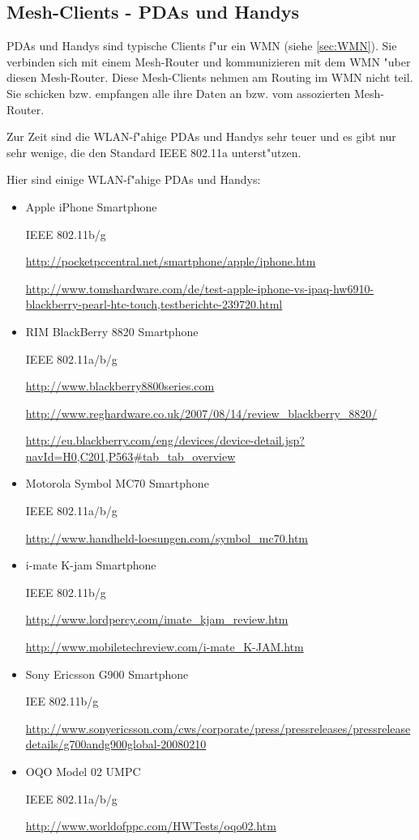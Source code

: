\subsection{Mesh-Clients - PDAs und Handys}

PDAs und Handys sind typische Clients f"ur ein WMN (siehe \ref{sec:WMN}).
Sie verbinden sich mit einem Mesh-Router und kommunizieren mit dem WMN
"uber diesen Mesh-Router.  Diese Mesh-Clients nehmen am Routing im WMN
nicht teil. Sie schicken bzw. empfangen alle ihre Daten an bzw. vom
assozierten Mesh-Router.

Zur Zeit sind die WLAN-f"ahige PDAs und Handys sehr teuer und
es gibt nur sehr wenige, die den Standard IEEE 802.11a unterst"utzen.

Hier sind einige WLAN-f"ahige PDAs und Handys:

\begin{itemize}	

\item Apple iPhone Smartphone

IEEE 802.11b/g

\url{http://pocketpccentral.net/smartphone/apple/iphone.htm}

\url{http://www.tomshardware.com/de/test-apple-iphone-vs-ipaq-hw6910-blackberry-pearl-htc-touch,testberichte-239720.html}

\item RIM BlackBerry 8820 Smartphone

IEEE 802.11a/b/g

\url{http://www.blackberry8800series.com}

\url{http://www.reghardware.co.uk/2007/08/14/review\_blackberry\_8820/}

\url{http://eu.blackberry.com/eng/devices/device-detail.jsp?navId=H0,C201,P563#tab\_tab\_overview}

\item Motorola Symbol MC70 Smartphone

IEEE 802.11a/b/g

\url{http://www.handheld-loesungen.com/symbol\_mc70.htm}

\item i-mate K-jam Smartphone

IEEE 802.11b/g

\url{http://www.lordpercy.com/imate\_kjam\_review.htm}

\url{http://www.mobiletechreview.com/i-mate\_K-JAM.htm}

\item Sony Ericsson G900 Smartphone

IEE 802.11b/g

\url{http://www.sonyericsson.com/cws/corporate/press/pressreleases/pressreleasedetails/g700andg900global-20080210}

\item OQO Model 02 UMPC

IEEE 802.11a/b/g

\url{http://www.worldofppc.com/HWTests/oqo02.htm}

\end{itemize}
